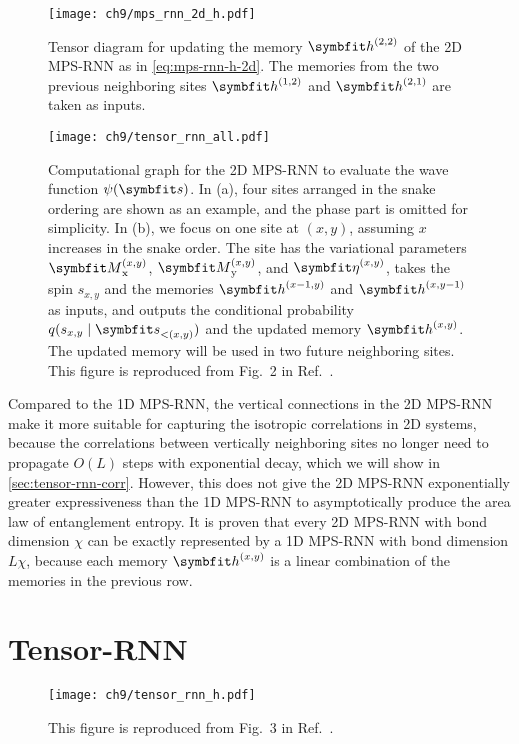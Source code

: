 \begin{figure}[htb]
\centering
\texttt{[image: ch9/mps\_rnn\_2d\_h.pdf]}
\caption[Tensor diagram for memory update of 2D MPS-RNN]{
Tensor diagram for updating the memory $\vh^{(2, 2)}$ of the 2D MPS-RNN as in \cref{eq:mps-rnn-h-2d}. The memories from the two previous neighboring sites $\vh^{(1, 2)}$ and $\vh^{(2, 1)}$ are taken as inputs.
}
\label{fig:mps-rnn-h-2d}
\end{figure}

\begin{figure}[htb]
\centering
\texttt{[image: ch9/tensor\_rnn\_all.pdf]}
\caption[Computational graph for 2D MPS-RNN]{
Computational graph for the 2D MPS-RNN to evaluate the wave function $\psi(\vs)$.
In (a), four sites arranged in the snake ordering are shown as an example, and the phase part is omitted for simplicity.
In (b), we focus on one site at $(x, y)$, assuming $x$ increases in the snake order.
The site has the variational parameters $\mM^{(x, y)}_\text{x}$, $\mM^{(x, y)}_\text{y}$, and $\vet^{(x, y)}$, takes the spin $s_{x, y}$ and the memories $\vh^{(x - 1, y)}$ and $\vh^{(x, y - 1)}$ as inputs, and outputs the conditional probability $q(s_{x, y} \mid \vs_{< (x, y)})$ and the updated memory $\vh^{(x, y)}$.
The updated memory will be used in two future neighboring sites.
This figure is reproduced from Fig.~2 in Ref.~\cite{wu2023tensor}.
}
\label{fig:tensor-rnn-all}
\end{figure}

Compared to the 1D MPS-RNN, the vertical connections in the 2D MPS-RNN make it more suitable for capturing the isotropic correlations in 2D systems, because the correlations between vertically neighboring sites no longer need to propagate $O(L)$ steps with exponential decay, which we will show in \cref{sec:tensor-rnn-corr}. However, this does not give the 2D MPS-RNN exponentially greater expressiveness than the 1D MPS-RNN to asymptotically produce the area law of entanglement entropy. It is proven that every 2D MPS-RNN with bond dimension $\chi$ can be exactly represented by a 1D MPS-RNN with bond dimension $L \chi$, because each memory $\vh^{(x, y)}$ is a linear combination of the memories in the previous row.

\section{Tensor-RNN}

\begin{figure}[htb]
\centering
\texttt{[image: ch9/tensor\_rnn\_h.pdf]}
\caption[Tensor diagram for memory update of tensor-RNN]{
This figure is reproduced from Fig.~3 in Ref.~\cite{wu2023tensor}.
}
\label{fig:tensor-rnn-h}
\end{figure}

